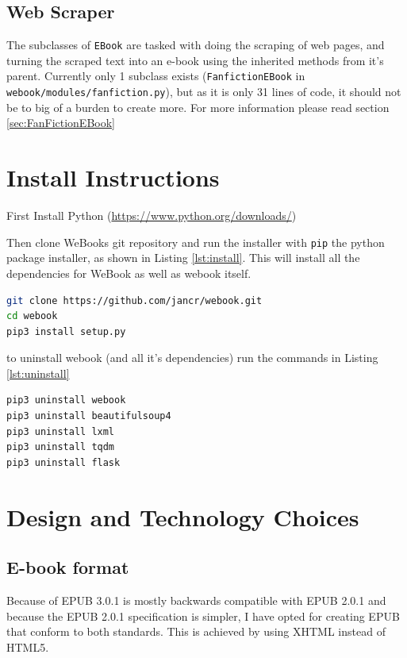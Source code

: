\documentclass[]{report}   %
\begin{document}
\subsection{Web Scraper}
The subclasses of \texttt{EBook} are tasked with doing the scraping of
web pages, and turning the scraped text into an e-book using the inherited
methods from it's parent. Currently only 1 subclass exists
(\texttt{FanfictionEBook} in \texttt{webook/modules/fanfiction.py}), but as it
is only 31 lines of code, it should not be to big of a burden to create more.
For more information please read section \ref{sec:FanFictionEBook}

\section{Install Instructions}
First Install Python (\url{https://www.python.org/downloads/})

Then clone WeBooks git repository and run the installer with \texttt{pip} the
python package installer, as shown in Listing \ref{lst:install}. This will
install all the dependencies for WeBook as well as webook itself. 

\begin{lstlisting}[language=bash, label={lst:install},
                   caption={WeBook install instructions}]
git clone https://github.com/jancr/webook.git
cd webook
pip3 install setup.py
\end{lstlisting}

to uninstall webook (and all it's dependencies) run the commands in Listing \ref{lst:uninstall}
\begin{lstlisting}[language=bash, label={lst:uninstall},
                   caption={WeBook uninstall instructions}]
pip3 uninstall webook
pip3 uninstall beautifulsoup4
pip3 uninstall lxml
pip3 uninstall tqdm
pip3 uninstall flask
\end{lstlisting}

\section{Design and Technology Choices}
\subsection{E-book format}
Because of EPUB 3.0.1 is mostly backwards compatible with EPUB
2.0.1\cite{epub2to3} and because the EPUB 2.0.1 specification is simpler, I have
opted for creating EPUB that conform to both standards. This is achieved by
using XHTML instead of HTML5.
\end{document}
